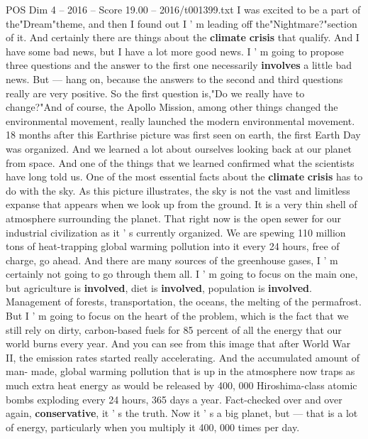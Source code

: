 \begin{textsample}{POS Dim 4 – 2016 – Score 19.00 – 2016/t001399.txt}  \label{ex:f4_pos_042}
I was excited to be a part of the"Dream"theme, and then I found out I ' m leading off the"Nightmare?"section of it.
And certainly there are things about the \textbf{climate} \textbf{crisis} that qualify.
And I have some bad news, but I have a lot more good news.
I ' m going to propose three questions and the answer to the first one necessarily \textbf{involves} a little bad news.
But — hang on, because the answers to the second and third questions really are very positive.
So the first question is,"Do we really have to change?"And of course, the Apollo Mission, among other things changed the environmental movement, really launched the modern environmental movement. 18 months after this Earthrise picture was first seen on earth, the first Earth Day was organized.
And we learned a lot about ourselves looking back at our planet from space.
And one of the things that we learned confirmed what the scientists have long told us.
One of the most essential facts about the \textbf{climate} \textbf{crisis} has to do with the sky.
As this picture illustrates, the sky is not the vast and limitless expanse that appears when we look up from the ground.
It is a very thin shell of atmosphere surrounding the planet.
That right now is the open sewer for our industrial civilization as it ' s currently organized.
We are spewing 110 million tons of heat-trapping global warming pollution into it every 24 hours, free of charge, go ahead.
And there are many sources of the greenhouse gases, I ' m certainly not going to go through them all.
I ' m going to focus on the main one, but agriculture is \textbf{involved}, diet is \textbf{involved}, population is \textbf{involved}.
Management of forests, transportation, the oceans, the melting of the permafrost.
But I ' m going to focus on the heart of the problem, which is the fact that we still rely on dirty, carbon-based fuels for 85 percent of all the energy that our world burns every year.
And you can see from this image that after World War II, the emission rates started really accelerating.
And the accumulated amount of man- made, global warming pollution that is up in the atmosphere now traps as much extra heat energy as would be released by 400, 000 Hiroshima-class atomic bombs exploding every 24 hours, 365 days a year.
Fact-checked over and over again, \textbf{conservative}, it ' s the truth.
Now it ' s a big planet, but — that is a lot of energy, particularly when you multiply it 400, 000 times per day.

\end{textsample}
